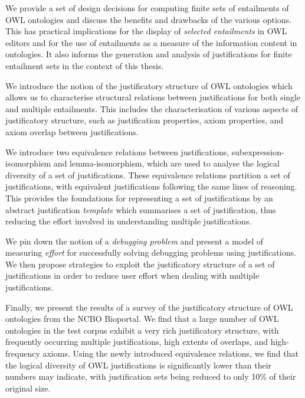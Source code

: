 \begin{compactitem}
\item We provide a set of design decisions for computing finite sets of entailments of OWL ontologies and discuss the benefits and drawbacks of the various options. This has practical implications for the display of \emph{selected entailments} in OWL editors and for the use of entailments as a measure of the information content in ontologies. It also informs the generation and analysis of justifications for finite entailment sets in the context of this thesis.

\item We introduce the notion of the justificatory structure of OWL ontologies which allows us to characterise structural relations between justifications for both single and multiple entailments. This includes the characterisation of various aspects of justificatory structure, such as justification properties, axiom properties, and axiom overlap between justifications.

\item We introduce two equivalence relations between justifications, subexpression-isomorphism and lemma-isomorphism, which are used to analyse the logical diversity of a set of justifications. These equivalence relations partition a set of justifications, with equivalent justifications following the same lines of reasoning. This provides the foundations for representing a set of justifications by an abstract justification \emph{template} which summarises a set of justification, thus reducing the effort involved in understanding multiple justifications.

\item We pin down the notion of a \emph{debugging problem} and present a model of measuring \emph{effort} for successfully solving debugging problems using justifications. We then propose strategies to exploit the justificatory structure of a set of justifications in order to reduce user effort when dealing with multiple justifications.

\item Finally, we present the results of a survey of the justificatory structure of OWL ontologies from the NCBO Bioportal. We find that a large number of OWL ontologies in the test corpus exhibit a very rich justificatory structure, with frequently occurring multiple justifications, high extents of overlaps, and high-frequency axioms. Using the newly introduced equivalence relations, we find that the logical diversity of OWL justifications is significantly lower than their numbers may indicate, with justification sets being reduced to only 10\% of their original size.


\end{compactitem}


